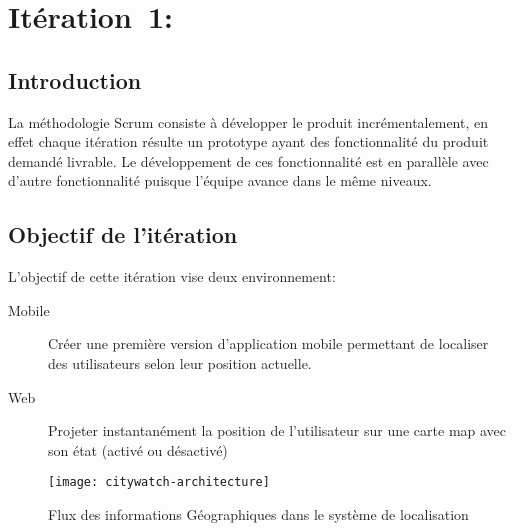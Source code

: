 \chapter[Itération~1:~(~2/22/2017~-~3/5/2017~)]{Itération~1:~\textup{}}

\section*{Introduction}

La méthodologie Scrum consiste à développer le produit incrémentalement, en
effet chaque itération résulte un prototype ayant des fonctionnalité du produit
demandé livrable. Le développement de ces fonctionnalité est en parallèle avec
d'autre fonctionnalité puisque l'équipe avance dans le même niveaux.

\section{Objectif de l'itération}

L'objectif de cette itération vise deux environnement:

\begin{description}
    \item [Mobile] Créer une première version d'application mobile permettant
        de localiser des utilisateurs selon leur position actuelle.
    \item [Web] Projeter instantanément la position de l'utilisateur sur une
        carte map avec son état (activé ou désactivé)
\end{description}

\begin{figure}[htbp]
    \centering
    \texttt{[image: citywatch-architecture]}
    \caption[Flux des information Géographiques en ]
    {Flux des informations Géographiques dans le système de localisation}
    \label{fig:citywatch-architecture}
\end{figure}



